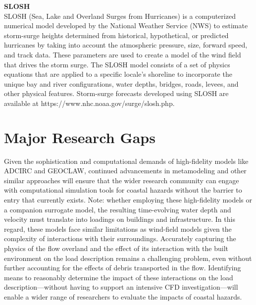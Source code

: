 \noindent\textbf{SLOSH} \\SLOSH (Sea, Lake and Overland Surges from Hurricanes) is a computerized numerical model developed by the National Weather Service (NWS) to estimate storm-surge heights determined from historical, hypothetical, or predicted hurricanes by taking into account the atmospheric pressure, size, forward speed, and track data. These parameters are used to create a model of the wind field that drives the storm surge. The SLOSH model consists of a set of physics equations that are applied to a specific locale's shoreline to incorporate the unique bay and river configurations, water depths, bridges, roads, levees, and other physical features. Storm-surge forecasts developed using SLOSH are available at https://www.nhc.noaa.gov/surge/slosh.php.

\section{Major Research Gaps}
\label{sec:storm_surge_gaps}

Given the sophistication and computational demands of high-fidelity models like ADCIRC and GEOCLAW, continued advancements in metamodeling and other similar approaches will ensure that the wider research community can engage with computational simulation tools for coastal hazards without the barrier to entry that currently exists. Note: whether employing these high-fidelity models or a companion surrogate model, the resulting time-evolving water depth and velocity must translate into loadings on buildings and infrastructure. In this regard, these models face similar limitations as wind-field models given the complexity of interactions with their surroundings. Accurately capturing the physics of the flow overland and the effect of its interaction with the built environment on the load description remains a challenging problem, even without further accounting for the effects of debris transported in the flow. Identifying means to reasonably determine the impact of these interactions on the load description—without having to support an intensive CFD investigation—will enable a wider range of researchers to evaluate the impacts of coastal hazards. 

%
